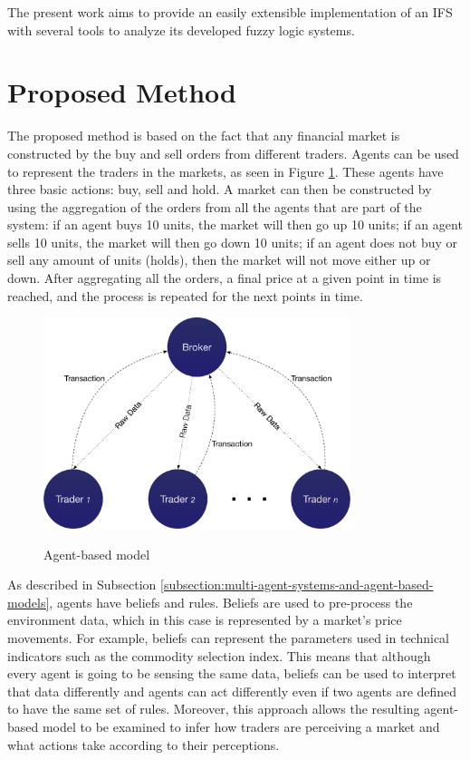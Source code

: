 \documentclass[review]{elsarticle}
\begin{document}
The present work aims to provide an easily extensible implementation of an IFS with several tools to analyze 
its developed fuzzy logic systems.

\section{Proposed Method}
\label{section:proposed-method}

The proposed method is based on the fact that any financial market is constructed by the buy and sell orders from different traders. Agents can be used to represent the traders in the markets, as seen in Figure \ref{figure:agent-based-model}. These agents have three basic actions: buy, sell and hold. A market can then be constructed by using the aggregation of the orders from all the agents that are part of the system: if an agent buys 10 units, the market will then go up 10 units; if an agent sells 10 units, the market will then go down 10 units; if an agent does not buy or sell any amount of units (holds), then the market will not move either up or down. After aggregating all the orders, a final price at a given point in time is reached, and the process is repeated for the next points in time.

\begin{figure}
\caption{Agent-based model}
\centering
\includegraphics[width=0.8\textwidth]{img/agent-model.pdf}
\label{figure:agent-based-model}
\end{figure}

As described in Subsection \ref{subsection:multi-agent-systems-and-agent-based-models}, agents have beliefs and rules. Beliefs are used to pre-process the environment data, which in this case is represented by a market's price movements. For example, beliefs can represent the parameters used in technical indicators such as the commodity selection index. This means that although every agent is going to be sensing the same data, beliefs can be used to interpret that data differently and agents can act differently even if two agents are defined to have the same set of rules. Moreover, this approach allows the resulting agent-based model to be examined to infer how traders are perceiving a market and what actions take according to their perceptions.
\end{document}
